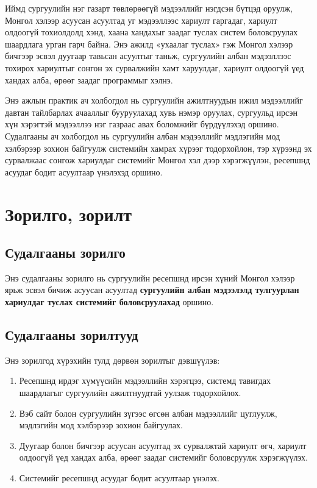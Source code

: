 Иймд сургуулийн нэг газарт төвлөрөөгүй мэдээллийг нэгдсэн бүтцэд оруулж, Монгол хэлээр асуусан асуултад уг мэдээллээс хариулт гаргадаг, хариулт олдоогүй тохиолдолд хэнд, хаана хандахыг заадаг туслах систем боловсруулах шаардлага урган гарч байна. Энэ ажилд «ухаалаг туслах» гэж Монгол хэлээр бичгээр эсвэл дуугаар тавьсан асуултыг таньж, сургуулийн албан мэдээллээс тохирох хариултыг сонгон эх сурвалжийн хамт харуулдаг, хариулт олдоогүй үед хандах алба, өрөөг заадаг программыг хэлнэ.

Энэ ажлын практик ач холбогдол нь сургуулийн ажилтнуудын ижил мэдээллийг давтан тайлбарлах ачааллыг бууруулахад хувь нэмэр оруулах, сургуульд ирсэн хүн хэрэгтэй мэдээллээ нэг газраас авах боломжийг бүрдүүлэхэд оршино. Судалгааны ач холбогдол нь сургуулийн албан мэдээллийг мэдлэгийн мод хэлбэрээр зохион байгуулж системийн хамрах хүрээг тодорхойлон, тэр хүрээнд эх сурвалжаас сонгож хариулдаг системийг Монгол хэл дээр хэрэгжүүлэн, ресепшнд асуудаг бодит асуултаар үнэлэхэд оршино.

\section{Зорилго, зорилт}
\label{sec:intro-goals}

\subsection{Судалгааны зорилго}

Энэ судалгааны зорилго нь сургуулийн ресепшнд ирсэн хүний Монгол хэлээр ярьж эсвэл бичиж асуусан асуултад \textbf{сургуулийн албан мэдээлэлд тулгуурлан хариулдаг туслах системийг боловсруулахад} оршино.

\subsection{Судалгааны зорилтууд}

Энэ зорилгод хүрэхийн тулд дөрвөн зорилтыг дэвшүүлэв:
\begin{enumerate}
    \item Ресепшнд ирдэг хүмүүсийн мэдээллийн хэрэгцээ, системд тавигдах шаардлагыг сургуулийн ажилтнуудтай уулзаж тодорхойлох.
    \item Вэб сайт болон сургуулийн зүгээс өгсөн албан мэдээллийг цуглуулж, мэдлэгийн мод хэлбэрээр зохион байгуулах.
    \item Дуугаар болон бичгээр асуусан асуултад эх сурвалжтай хариулт өгч, хариулт олдоогүй үед хандах алба, өрөөг заадаг системийг боловсруулж хэрэгжүүлэх.
    \item Системийг ресепшнд асуудаг бодит асуултаар үнэлэх.
\end{enumerate}

